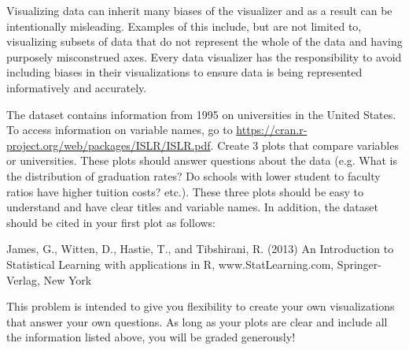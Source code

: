 \begin{warn}
Visualizing data can inherit many biases of the visualizer and as a result can be intentionally misleading.
Examples of this include, but are not limited to, visualizing subsets of data that do not represent the whole of the data and having purposely misconstrued axes.
Every data visualizer has the responsibility to avoid including biases in their visualizations to ensure data is being represented informatively and accurately.
\end{warn}
\begin{problem}
The dataset  contains information from 1995 on universities in the United States.
To access information on variable names, go to \url{https://cran.r-project.org/web/packages/ISLR/ISLR.pdf}.
Create 3 plots that compare variables or universities.
These plots should answer questions about the data (e.g. What is the distribution of graduation rates? Do schools with lower student to faculty ratios have higher tuition costs? etc.).
These three plots should be easy to understand and have clear titles and variable names.
In addition, the dataset should be cited in your first plot as follows:

James, G., Witten, D., Hastie, T., and Tibshirani, R. (2013) An Introduction to Statistical Learning with applications in R, www.StatLearning.com, Springer-Verlag, New York

This problem is intended to give you flexibility to create your own visualizations that answer your own questions.
As long as your plots are clear and include all the information listed above, you will be graded generously!
\end{problem}
